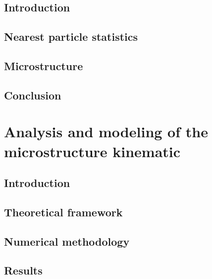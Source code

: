 \documentclass[12pt,a4paper,openany]{My_book}
\begin{document}
\section{Introduction}


\section{Nearest particle statistics}
\label{sec:nearest}


\section{Microstructure}
\label{sec:microstructure}



\section{Conclusion}
\label{sec:conclusion}



\chapter{Analysis and modeling of the microstructure kinematic}
\localtableofcontents

\section{Introduction}


% 

\section{Theoretical framework}
\label{sec:Theory}



\section{Numerical methodology}
\label{sec:methodo}


\section{Results}
\end{document}

